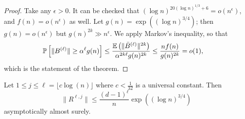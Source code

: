 \begin{proof}
Take any $\epsilon > 0$.
It can be checked that 
$(\log n)^{20 (\log n)^{1/3} + 6}= o(n^{\epsilon})$, and 
$f(n) = o(n^{\epsilon})$ as well.
Let $g(n) = \exp((\log n)^{3/4})$;
then $g(n) = o(n^\epsilon)$ but
$g(n)^{2k} \gg n^\epsilon$.
We apply Markov's inequality, so that
\begin{align}
\mathbb{P} \left[
\| B^{(\ell)} \| 
\geq 
\alpha^{\ell} g(n)
\right]
&\leq 
\frac{ \mathbb{E} \left( \| \bar{B}^{(\ell)} \|^{2k} \right) }{ \alpha^{2k\ell} g(n)^{2k}}
\leq  
\frac{n f(n)}{g(n)^{2k}}=o(1),
\label{eq:f_over_g}
\end{align}
which is the statement of the theorem.
\end{proof}

\begin{theorem}
\label{spec_R}
Let $1\leq j\leq \ell = \lfloor c \log(n) \rfloor$ 
where $c < \frac{1}{32}$ is a universal constant.
Then
\[
\|R^{\ell,j}\| 
\leq 
\frac{(d-1)^\ell}{n} \exp((\log n)^{3/4})
\]
asymptotically almost surely.
\end{theorem}

